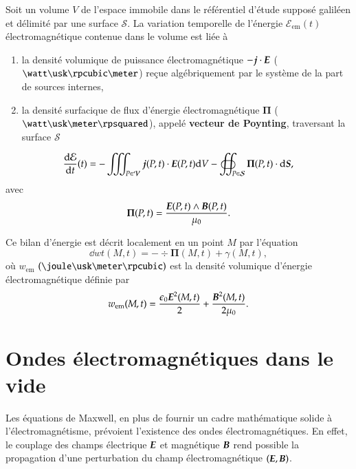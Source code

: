 \begin{defn}
	Soit un volume $V$ de l'espace immobile dans le référentiel d'étude supposé
	galiléen et délimité par une surface $\mathcal{S}$. La variation 
	temporelle de l'énergie $\mathcal{E}_\mathrm{em}(t)$ électromagnétique
	contenue dans le volume est liée à
	\begin{enumerate}
	\item la densité volumique de puissance électromagnétique
		$- \vecj \cdot \vece$ ($\watt \usk \rpcubic \meter$) 
	  reçue algébriquement par le système de la part de sources internes,
	
	\item la densité surfacique de flux d'énergie électromagnétique $\mathbf{\Pi}$
		($\watt \usk \meter \rpsquared$),
  	  appelé \textbf{vecteur de Poynting}, traversant la surface $\mathcal{S}$
	\end{enumerate}
	
	\begin{equation}
		\dn{\mathcal{E}}{t}(t) = - \iiint_{P \in \mathcal{V}} 
		\vecj(P, t) \cdot \vece(P, t) \dV 
		- \oiint_{P \in \mathcal{S}} \mathbf{\Pi}(P, t) \cdot \ds,
	\end{equation}
	avec
	\begin{equation}
		\mathbf{\Pi}(P, t) = \dfrac{\vece(P, t) \wedge \vecb(P, t)}{\mu_0}.
	\end{equation}

	Ce bilan d'énergie est décrit localement en un point $M$
	par l'équation
	\begin{equation}
		\dd{w}{t}(M, t) = -\div \mathbf{\Pi}(M, t) + \gamma(M, t),
	\end{equation}
	où $w_\mathrm{em}$ $(\joule \usk \meter \rpcubic)$ 
	est la densité volumique d'énergie électromagnétique définie par
	\begin{equation}
		w_\mathrm{em}(M, t) = \dfrac{\epsilon_0 \vece^2(M, t)}{2} 
		+ \dfrac{\vecb^2(M, t)}{2 \mu_0}.
	\end{equation}
\end{defn}

\section{Ondes électromagnétiques dans le vide}
Les équations de Maxwell, en plus de fournir un cadre mathématique solide 
à l'électromagnétisme, prévoient l'existence des ondes électromagnétiques. 
En effet, le couplage des champs électrique $\vece$ et magnétique $\vecb$ 
rend possible la propagation d'une perturbation du champ électromagnétique
$(\vece, \vecb)$. 

